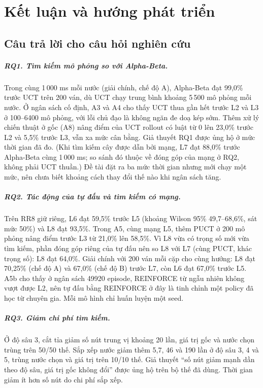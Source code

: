 \chapter{Kết luận và hướng phát triển}
\label{ch:ket-luan}

\section{Câu trả lời cho câu hỏi nghiên cứu}
\paragraph{RQ1. Tìm kiếm mô phỏng so với Alpha-Beta.}
Trong cùng 1\,000 ms mỗi nước (giải chính, chế độ A), Alpha-Beta đạt 99{,}0\% trước UCT trên 200 ván, dù UCT chạy trung bình khoảng 5\,500 mô phỏng mỗi nước. Ở ngân sách cố định, A3 và A4 cho thấy UCT thua gần hết trước L2 và L3 ở 100--6400 mô phỏng, với lỗi chủ đạo là không ngăn đe doạ kép sớm. Thêm xử lý chiến thuật ở gốc (A8) nâng điểm của UCT rollout có luật từ 0 lên 23{,}0\% trước L2 và 5{,}5\% trước L3, vẫn xa mức cân bằng. Giả thuyết RQ1 được ủng hộ ở mức thời gian đã đo. (Khi tìm kiếm cây được dẫn bởi mạng, L7 đạt 88{,}0\% trước Alpha-Beta cùng 1\,000 ms; so sánh đó thuộc về đóng góp của mạng ở RQ2, không phải UCT thuần.) Đề tài đặt ra ba mức thời gian nhưng mới chạy một mức, nên chưa biết khoảng cách thay đổi thế nào khi ngân sách tăng.

\paragraph{RQ2. Tác động của tự đấu và tìm kiếm có mạng.}
Trên RR8 giữ riêng, L6 đạt 59{,}5\% trước L5 (khoảng Wilson 95\% 49{,}7--68{,}6\%, sát mức 50\%) và L8 đạt 93{,}5\%. Trong A5, cùng mạng L5, thêm PUCT ở 200 mô phỏng nâng điểm trước L3 từ 21{,}0\% lên 58{,}5\%. Vì L8 vừa có trọng số mới vừa tìm kiếm, phần đóng góp riêng của tự đấu nên so L8 với L7 (cùng PUCT, khác trọng số): L8 đạt 64{,}0\%. Giải chính với 200 ván mỗi cặp cho cùng hướng: L8 đạt 70{,}25\% (chế độ A) và 67{,}0\% (chế độ B) trước L7, còn L6 đạt 67{,}0\% trước L5. A5b cho thấy ở ngân sách \num{49920} episode, REINFORCE từ ngẫu nhiên không vượt được L2, nên tự đấu bằng REINFORCE ở đây là tinh chỉnh một policy đã học từ chuyên gia. Mỗi mô hình chỉ huấn luyện một seed.

\paragraph{RQ3. Giảm chi phí tìm kiếm.}
Ở độ sâu 3, cắt tỉa giảm số nút trung vị khoảng 20 lần, giá trị gốc và nước chọn trùng trên 50/50 thế. Sắp xếp nước giảm thêm 5{,}7, 46 và 190 lần ở độ sâu 3, 4 và 5, trùng nước chọn và giá trị trên 10/10 thế. Giả thuyết ``số nút giảm mạnh dần theo độ sâu, giá trị gốc không đổi'' được ủng hộ trên bộ thế đã dùng. Thời gian giảm ít hơn số nút do chi phí sắp xếp.

